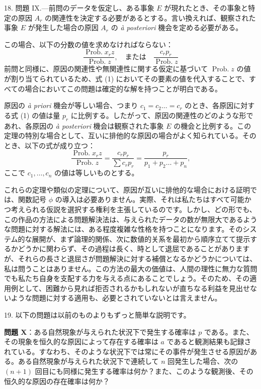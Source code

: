 \documentclass[a4paper,11pt,openany]{ltjsbook}
\begin{document}
18. 問題 IX.---前問のデータを仮定し、ある事象 \( E \) が現れたとき、その事象と特定の原因 \( A_r \) の関連性を決定する必要があるとする。言い換えれば、観察された事象 \( E \) が発生した場合の原因 \( A_r \) の \textit{\`{a} posteriori} 機会を定める必要がある。

この場合、以下の分数の値を求めなければならない：
\[
\frac{\operatorname{Prob. } x_r z}{\operatorname{Prob. } z}, \quad \text{または} \quad \frac{c_r p_r}{\operatorname{Prob. } z}
\]
前問と同様に、原因の関連性や無関連性に関する仮定に基づいて \( \operatorname{Prob. } z \) の値が割り当てられているため、式 (1) においてその要素の値を代入することで、すべての場合においてこの問題は確定的な解を持つことが明白である。

原因の \textit{\`{a} priori} 機会が等しい場合、つまり \( c_1 = c_2 \dotso = c_r \) のとき、各原因に対する式 (1) の値は量 \( p_r \) に比例する。したがって、原因の関連性のどのような形であれ、各原因の \textit{\`{a} posteriori} 機会は観察された事象 \( E \) の機会と比例する。この定理の特別な場合として、互いに排他的な原因の場合がよく知られている。そのとき、以下の式が成り立つ：
\[
\frac{\operatorname{Prob. } x_r z}{\operatorname{Prob. } z} = \frac{c_r p_r}{{\textstyle \sum} c_r p_r} = \frac{p_r}{p_1 + p_2 \dotso + p_n},
\]
ここで \( c_1, \dotsc, c_n \) の値は等しいものとする。

これらの定理や類似の定理について、原因が互いに排他的な場合における証明では、関数記号 $\phi$ の導入は必要ありません。実際、それは私たちはすべて可能かつ考えられる仮説を選択する権利を主張しているのです。しかし、どの形でも、この作品の方法による問題解決法は、与えられたデータの数が無限大であるような問題に対する解法には、ある程度複雑な性格を持つことになります。そのシステム的な展開が、まず論理的関係、次に数値的关系を最初から順序立てて提示するかどうかに関わらず、その過程は長く、時として退屈であることがありますが、それらの長さと退屈さが問題解決に対する補償となるかどうかについては、私は問うことはありません。この方法の最大の価値は、人間の理性に無力な質問でも私たち自身を支配する力を与える点にあることでしょう。そのため、その適用例として、困難から見れば拒否されるかもしれないが直ちなる利益を見出せないような問題に対する適用も、必要とされていないとは言えません。

19. 以下の問題は以前のものよりもずっと簡単な説明です。

\textbf{問題 X}：ある自然現象が与えられた状況下で発生する確率は $p$ である。また、その現象を恒久的な原因によって存在する確率は $a$ であると観測結果も記録されている。すなわち、そのような状況下では常にその事件が発生させる原因がある。ある自然現象が与えられた状況下で連続して $n$ 回発生した場合、次の $(n+1)$ 回目にも同様に発生する確率は何か？また、このような観測後、その恒久的な原因の存在確率は何か？
\end{document}
